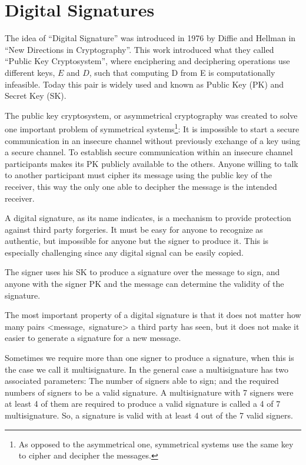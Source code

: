 \section{Digital Signatures}
The idea of ``Digital Signature'' was introduced in 1976 by Diffie and
  Hellman in ``New Directions in Cryptography''\cite{diffie1976new}. This work
  introduced what they called ``Public Key Cryptosystem'', where enciphering and
  deciphering operations use different keys, $E$ and $D$, such that computing D
  from E is computationally infeasible.
Today this pair is widely used and known as Public Key (PK) and Secret Key (SK).

The public key cryptosystem, or asymmetrical cryptography was created to solve
  one important problem of symmetrical systems\footnote{As opposed to the
  asymmetrical one, symmetrical systems use the same key to cipher and decipher
  the messages.}: It is impossible to start a secure communication in an
  insecure channel without previously exchange of a key using a secure channel.
To establish secure communication within an insecure channel participants makes
  its PK publicly available to the others.
Anyone willing to talk to another participant must cipher its message using the
  public key of the receiver, this way the only one able to decipher the message
  is the intended receiver.

A digital signature, as its name indicates, is a mechanism to provide protection
  against third party forgeries. It must be easy for anyone to recognize as
  authentic, but impossible for anyone but the signer to produce it. This is
  especially challenging since any digital signal can be easily copied.

The signer uses his SK to produce a signature over the message to sign, and
  anyone with the signer PK and the message can determine the validity of the
  signature.

The most important property of a digital signature is that it does not matter how
  many pairs \mbox{\textless message, signature\textgreater} a third party has
  seen, but it does not make it easier to generate a signature for a new
  message.

Sometimes we require more than one signer to produce a signature, when this is
  the case we call it multisignature.
In the general case a multisignature has two associated parameters: The number
  of signers able to sign; and the required numbers of signers to be a valid
  signature.
A multisignature with 7 signers were at least 4 of them are required to produce
  a valid signature is called a 4 of 7 multisignature.
So, a signature is valid with at least 4 out of the 7 valid signers.
